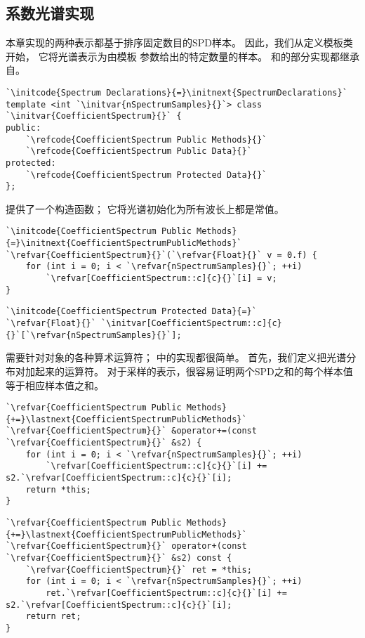 \subsection{系数光谱实现}\label{sub:系数光谱实现}
本章实现的两种表示都基于排序固定数目的SPD样本。
因此，我们从定义模板类开始，
它将光谱表示为由模板
参数给出的特定数量的样本。
和的部分实现都继承自。
\begin{lstlisting}
`\initcode{Spectrum Declarations}{=}\initnext{SpectrumDeclarations}`
template <int `\initvar{nSpectrumSamples}{}`> class `\initvar{CoefficientSpectrum}{}` {
public:
    `\refcode{CoefficientSpectrum Public Methods}{}`
    `\refcode{CoefficientSpectrum Public Data}{}`
protected:
    `\refcode{CoefficientSpectrum Protected Data}{}`
};
\end{lstlisting}
提供了一个构造函数；
它将光谱初始化为所有波长上都是常值。
\begin{lstlisting}
`\initcode{CoefficientSpectrum Public Methods}{=}\initnext{CoefficientSpectrumPublicMethods}`
`\refvar{CoefficientSpectrum}{}`(`\refvar{Float}{}` v = 0.f) {
    for (int i = 0; i < `\refvar{nSpectrumSamples}{}`; ++i)
        `\refvar[CoefficientSpectrum::c]{c}{}`[i] = v;
}
\end{lstlisting}
\begin{lstlisting}
`\initcode{CoefficientSpectrum Protected Data}{=}`
`\refvar{Float}{}` `\initvar[CoefficientSpectrum::c]{c}{}`[`\refvar{nSpectrumSamples}{}`];
\end{lstlisting}
需要针对对象的各种算术运算符；
中的实现都很简单。
首先，我们定义把光谱分布对加起来的运算符。
对于采样的表示，很容易证明两个SPD之和的每个样本值等于相应样本值之和。
\begin{lstlisting}
`\refvar{CoefficientSpectrum Public Methods}{+=}\lastnext{CoefficientSpectrumPublicMethods}`
`\refvar{CoefficientSpectrum}{}` &operator+=(const `\refvar{CoefficientSpectrum}{}` &s2) {
    for (int i = 0; i < `\refvar{nSpectrumSamples}{}`; ++i)
        `\refvar[CoefficientSpectrum::c]{c}{}`[i] += s2.`\refvar[CoefficientSpectrum::c]{c}{}`[i];
    return *this;
}
\end{lstlisting}
\begin{lstlisting}
`\refvar{CoefficientSpectrum Public Methods}{+=}\lastnext{CoefficientSpectrumPublicMethods}`
`\refvar{CoefficientSpectrum}{}` operator+(const `\refvar{CoefficientSpectrum}{}` &s2) const {
    `\refvar{CoefficientSpectrum}{}` ret = *this;
    for (int i = 0; i < `\refvar{nSpectrumSamples}{}`; ++i)
        ret.`\refvar[CoefficientSpectrum::c]{c}{}`[i] += s2.`\refvar[CoefficientSpectrum::c]{c}{}`[i];
    return ret;
}
\end{lstlisting}


